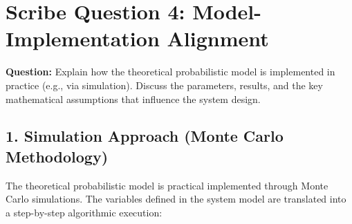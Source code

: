 \documentclass[12pt,a4paper]{article}
\begin{document}
\newpage

\section{Scribe Question 4: Model-Implementation Alignment}

\textbf{Question:} Explain how the theoretical probabilistic model is implemented in practice (e.g., via simulation). Discuss the parameters, results, and the key mathematical assumptions that influence the system design.

\subsection{1. Simulation Approach (Monte Carlo Methodology)}

The theoretical probabilistic model is practical implemented through Monte Carlo simulations. The variables defined in the system model are translated into a step-by-step algorithmic execution:
\end{document}
